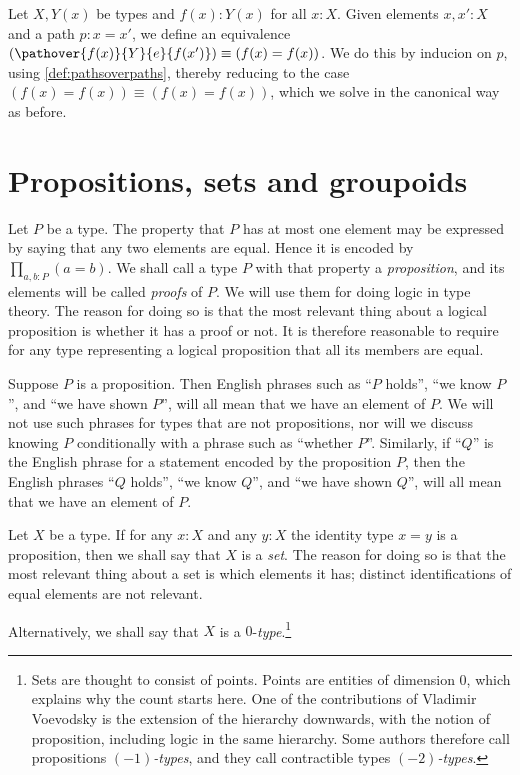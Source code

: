\begin{definition}\label{def:Dan's-lemma}
Let $X,Y(x)$ be types and $f(x): Y(x)$ for all $x:X$.
Given elements $x,x':X$ and a path $p : x = x'$, we define an equivalence
$(\pathover{f(x)}{Y}{e}{f(x')}) \equiv (f(x)=f(x))$.
We do this by inducion on $p$, using \cref{def:pathsoverpaths},
thereby reducing to the case $(f(x)=f(x)) \equiv (f(x)=f(x))$,
which we solve in the canonical way as before.
\end{definition}


\section{Propositions, sets and groupoids}
\label{sec:props-sets-grpds}

Let $P$ be a type.  The property that $P$ has at most one element may
be expressed by saying that any two elements are equal.
Hence it is encoded by $\prod_{a,b:P} (a=b)$.
We shall call a type $P$ with that property a \emph{proposition},%
and its elements will be called \emph{proofs} of $P$.%
We will use them for doing logic in type theory.
The reason for doing so is that the most relevant
thing about a logical proposition is whether it has a proof or not.
It is therefore reasonable to require for any type representing
a logical proposition that all its members are equal.

Suppose $P$ is a proposition.  Then English phrases such as ``$P$ holds'', ``we know $P$'', and ``we have shown $P$'', will all mean that we
have an element of $P$.  We will not use such phrases for types that are not propositions, nor will we discuss knowing $P$ conditionally with a
phrase such as ``whether $P$''.  Similarly, if ``$Q$'' is the English phrase for a statement encoded by the proposition $P$, then the English
phrases ``$Q$ holds'', ``we know $Q$'', and ``we have shown $Q$'', will all mean that we have an element of $P$.

Let $X$ be a type.  If for any $x:X$ and any $y:X$ the identity
type $x=y$ is a proposition, then we shall say that $X$ is a \emph{set}.%
The reason for doing so is that the most relevant
thing about a set is which elements it has; distinct identifications
of equal elements are not relevant.

Alternatively, we shall say that $X$ is a $0$-\emph{type}.\footnote{%
Sets are thought to consist of points. Points are entities of dimension 0,
which explains why the count starts here.
One of the contributions of Vladimir Voevodsky is the extension of
the hierarchy downwards, with the notion of proposition,
including logic in the same hierarchy.
Some authors therefore call propositions \emph{$(-1)$-types},
and they call contractible types \emph{$(-2)$-types}.}

